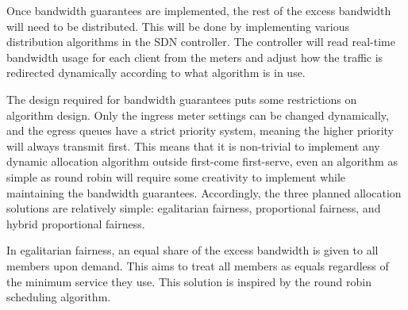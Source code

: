 \documentclass[accepted,single]{gipaper}
\begin{document}
Once bandwidth guarantees are implemented, the rest of the excess bandwidth will need to be distributed. This will be done by implementing various distribution algorithms in the SDN controller. The controller will read real-time bandwidth usage for each client from the meters and adjust how the traffic is redirected dynamically according to what algorithm is in use. 

The design required for bandwidth guarantees puts some restrictions on algorithm design. Only the ingress meter settings can be changed dynamically, and the egress queues have a strict priority system, meaning the higher priority will always transmit first. This means that it is non-trivial to implement any dynamic allocation algorithm outside first-come first-serve, even an algorithm as simple as round robin will require some creativity to implement while maintaining the bandwidth guarantees. Accordingly, the three planned allocation solutions are relatively simple: egalitarian fairness, proportional fairness, and hybrid proportional fairness.

In egalitarian fairness, an equal share of the excess bandwidth is given to all members upon demand. This aims to treat all members as equals regardless of the minimum service they use. This solution is inspired by the round robin scheduling algorithm.

\end{document}
